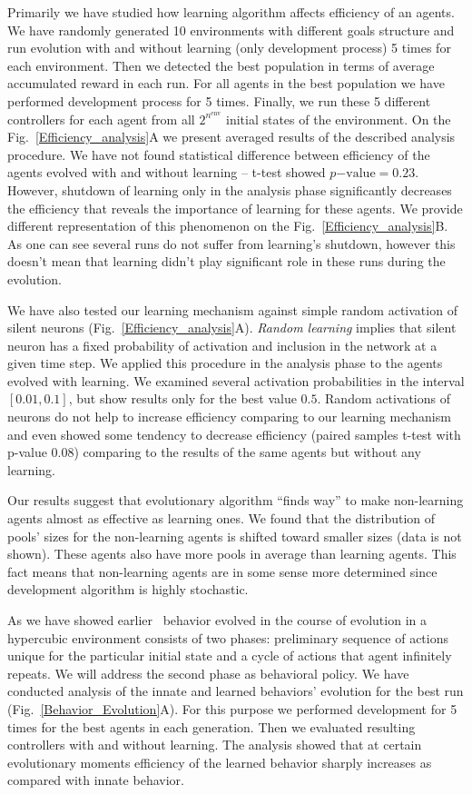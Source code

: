 \documentclass[letterpaper]{article}
\begin{document}
Primarily we have studied how learning algorithm affects efficiency of an agents. We have randomly generated 10 environments with different goals structure and run evolution with and without learning (only development process) 5 times for each environment. Then we detected the best population in terms of average accumulated reward in each run. For all agents in the best population we have performed development process for 5 times. Finally, we run these 5 different controllers for each agent from all $2^{n^{\mathrm{env}}}$ initial states of the environment. On the Fig.~\ref{Efficiency_analysis}A we present averaged results of the described analysis procedure. We have not found statistical difference between efficiency of the agents evolved with and without learning -- t-test showed $p\mathrm{-value}=0.23$. However, shutdown of learning only in the analysis phase significantly decreases the efficiency that reveals the importance of learning for these agents. We provide different representation of this phenomenon on the Fig.~\ref{Efficiency_analysis}B. As one can see several runs do not suffer from learning's shutdown, however this doesn't mean that learning didn't play significant role in these runs during the evolution. 

We have also tested our learning mechanism against simple random activation of silent neurons (Fig.~\ref{Efficiency_analysis}A). {\em Random learning} implies that silent neuron has a fixed probability of activation and inclusion in the network at a given time step. We applied this procedure in the analysis phase to the agents evolved with learning. We examined several activation probabilities in the interval $\left[0.01,0.1\right]$, but show results only for the best value $0.5$. Random activations of neurons do not help to increase efficiency comparing to our learning mechanism and even showed some tendency to decrease efficiency (paired samples t-test with p-value $0.08$) comparing to the results of the same agents but without any learning.

Our results suggest that evolutionary algorithm ``finds way'' to make non-learning agents almost as effective as learning ones. We found that the distribution of pools' sizes for the non-learning agents is shifted toward smaller sizes (data is not shown). These agents also have more pools in average than learning agents. This fact means that non-learning agents are in some sense more determined since development algorithm is highly stochastic. 

As we have showed earlier~\citep{LakhmanBurtsev2013} behavior evolved in the course of evolution in a hypercubic environment consists of two phases: preliminary sequence of actions unique for the particular initial state and a cycle of actions that agent infinitely repeats. We will address the second phase as behavioral policy. We have conducted analysis of the innate and learned behaviors' evolution for the best run (Fig.~\ref{Behavior_Evolution}A). For this purpose we performed development for 5 times for the best agents in each generation. Then we evaluated resulting controllers with and without learning. The analysis showed that at certain evolutionary moments efficiency of the learned behavior sharply increases as compared with innate behavior.
\end{document}
